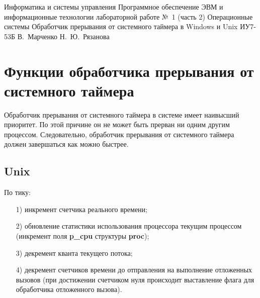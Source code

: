 \documentclass{bmstu}
\begin{document}
\makereporttitle
    {Информатика и системы управления}
    {Программное обеспечение ЭВМ и информационные технологии}
    {лабораторной работе №~1 (часть 2)}
    {Операционные системы}
    {Обработчик прерывания от системного таймера в Windows и Unix}
    {}
    {ИУ7-53Б}
    {В.~Марченко}
    {Н.~Ю.~Рязанова}
    {}

\maketableofcontents

\chapter{Функции обработчика прерывания от системного таймера}

Обработчик прерывания от системного таймера в системе имеет наивысший приоритет. 
По этой причине он не может быть прерван ни одним другим процессом. 
Следовательно, обработчик прерывания от системного таймера должен завершаться как можно быстрее.

\section{Unix}
    
По тику:
\begin{enumerate}
\item[1)] инкремент счетчика реального времени;
\item[2)] обновление статистики использования процессора текущим процессом (инкремент поля \textbf{p\_cpu} структуры \textbf{proc});
\item[3)] декремент кванта текущего потока;
\item[4)] декремент счетчиков времени до отправления на выполнение отложенных вызовов (при достижении счетчиком нуля происходит выставление флага для обработчика отложенного вызова).
\end{enumerate}
\end{document}
